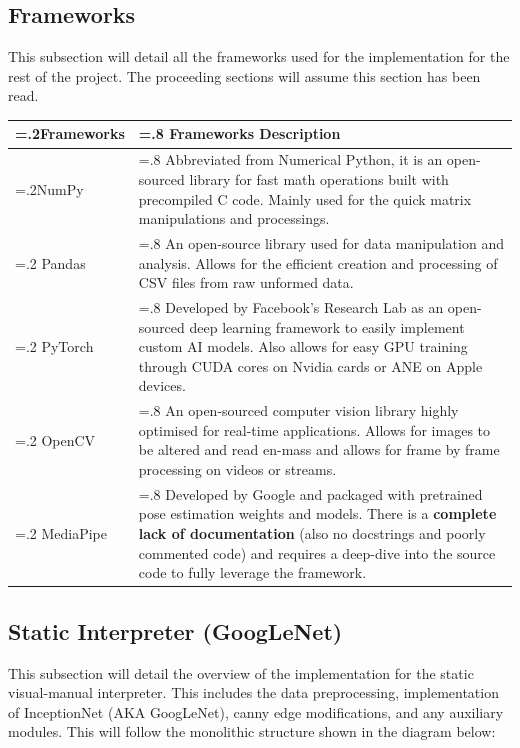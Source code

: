 \documentclass[11pt]{article}
\begin{document}
    \subsection{Frameworks}
    This subsection will detail all the frameworks used for the implementation for the rest of the project. The proceeding sections will assume this section has been read.

    \begin{center}
        \begin{tabularx}{1\textwidth}
            { 
            | >{\raggedright\arraybackslash\hsize=.2\hsize}X 
            | >{\raggedright\arraybackslash\hsize=.8\hsize}X | 
            }
            \hline
                \textbf{Frameworks} & \textbf{Frameworks Description} \\ [0.5ex] 
            \hline

            \hline
                \hline
                NumPy & Abbreviated from Numerical Python, it is an open-sourced library for fast math operations built with precompiled C code. Mainly used for the quick matrix manipulations and processings. \\
                \hline
                Pandas & An open-source library used for data manipulation and analysis. Allows for the efficient creation and processing of CSV files from raw unformed data. \\
                \hline
                PyTorch & Developed by Facebook's Research Lab as an open-sourced deep learning framework to easily implement custom AI models. Also allows for easy GPU training through CUDA cores on Nvidia cards or ANE on Apple devices.\\
                \hline
                OpenCV & An open-sourced computer vision library highly optimised for real-time applications. Allows for images to be altered and read en-mass and allows for frame by frame processing on videos or streams.\\
                \hline
                MediaPipe & Developed by Google and packaged with pretrained pose estimation weights and models. There is a \textbf{complete lack of documentation} (also no docstrings and poorly commented code) and requires a deep-dive into the source code to fully leverage the framework.\\
            \hline
        \end{tabularx}
        \end{center}

    \subsection{Static Interpreter (GoogLeNet)}
    This subsection will detail the overview of the implementation for the static visual-manual interpreter. This includes the data preprocessing, implementation of InceptionNet (AKA GoogLeNet), canny edge modifications, and any auxiliary modules. This will follow the monolithic structure shown in the diagram below:
\end{document}
